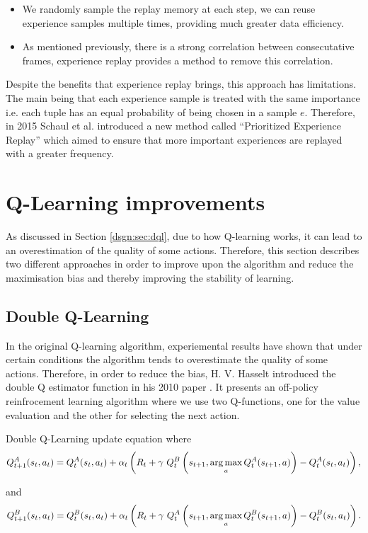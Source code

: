 \begin{itemize}
	\item We randomly sample the replay memory at each step, we can reuse experience samples multiple times, providing much greater data efficiency.
	\item As mentioned previously, there is a strong correlation between consecutative frames, experience replay provides a method to remove this correlation.
\end{itemize}

Despite the benefits that experience replay brings, this approach has limitations. The main being that each experience sample is treated with the same importance i.e. each tuple has an equal probability of being chosen in a sample $e$. Therefore, in 2015 Schaul et al. \cite{per} introduced a new method called ``Prioritized Experience Replay'' which aimed to ensure that more important experiences are replayed with a greater frequency.

\section{Q-Learning improvements}
\label{dsgn:sec:qlearning:qextra}
As discussed in Section \ref{dsgn:sec:dql}, due to how Q-learning works, it can lead to an overestimation of the quality of some actions. Therefore, this section describes two different approaches in order to improve upon the algorithm and reduce the maximisation bias and thereby improving the stability of learning.

\subsection{Double Q-Learning}
\label{dsgn:sec:qlearning:doubledqn}
In the original Q-learning algorithm, experiemental results have shown that under certain conditions the algorithm tends to overestimate the quality of some actions. Therefore, in order to reduce the bias, H. V. Hasselt introduced the double Q estimator function in his 2010 paper \cite{double-ql}. It presents an off-policy reinfrocement learning algorithm where we use two Q-functions, one for the value evaluation and the other for selecting the next action.

\begin{defn}
	Double Q-Learning update equation where
	\[
		Q_{t+1}^A (s_t, a_t) = Q_t^A (s_t, a_t) + \alpha_t \left( R_t + \gamma~Q_t^B \left( s_{t + 1}, \operatorname*{arg\,max}_a Q_t^A (s_{t + 1}, a) \right) - Q_t^A (s_t, a_t) \right) ,
	\]

	and
	\[
		Q_{t+1}^B (s_t, a_t) = Q_t^B (s_t, a_t) + \alpha_t \left( R_t + \gamma~Q_t^A \left( s_{t + 1}, \operatorname*{arg\,max}_a Q_t^B (s_{t + 1}, a) \right) - Q_t^B (s_t, a_t) \right) .
	\]
\end{defn}

